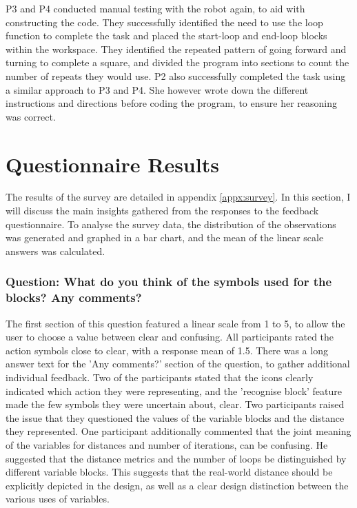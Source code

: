 \documentclass[oneside,%
                    author={Malak Hajji},
                    degree={BSc},
                    title={Designing An Accessible Ozobot Programming Platform for Students},
                  subtitle={With Mixed Visual Abilities}]{dissertation}
\begin{document}
P3 and P4 conducted manual testing with the robot again, to aid with constructing the code. They successfully identified the need to use the loop function to complete the task and placed the start-loop and end-loop blocks within the workspace. They identified the repeated pattern of going forward and turning to complete a square, and divided the program into sections to count the number of repeats they would use. 
P2 also successfully completed the task using a similar approach to P3 and P4. She however wrote down the different instructions and directions before coding the program, to ensure her reasoning was correct.


\section{Questionnaire Results}
\label{qresults}
The results of the survey are detailed in appendix \ref{appx:survey}. In this section, I will discuss the main insights gathered from the responses to the feedback questionnaire. To analyse the survey data, the distribution of the observations was generated and graphed in a bar chart, and the mean of the linear scale answers was calculated.

\subsubsection{Question: What do you think of the symbols used for the blocks? Any comments?}
The first section of this question featured a linear scale from 1 to 5, to allow the user to choose a value between clear and confusing. All participants rated the action symbols close to clear, with a response mean of 1.5.
There was a long answer text for the 'Any comments?' section of the question, to gather additional individual feedback. 
Two of the participants stated that the icons clearly indicated which action they were representing, and the 'recognise block' feature made the few symbols they were uncertain about, clear. Two participants raised the issue that they questioned the values of the variable blocks and the distance they represented. One participant additionally commented that the joint meaning of the variables for distances and number of iterations, can be confusing. He suggested that the distance metrics and the number of loops be distinguished by different variable blocks. This suggests that the real-world distance should be explicitly depicted in the design, as well as a clear design distinction between the various uses of variables.
\end{document}

